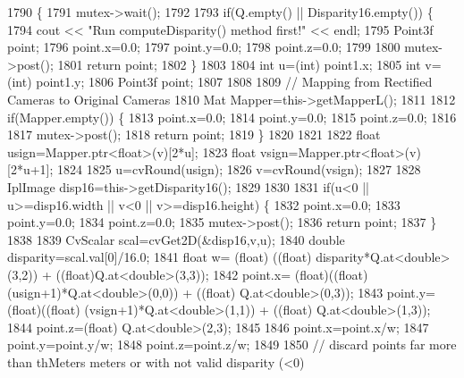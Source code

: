 \begin{DoxyCode}
1790                                                                           \{
1791     mutex->wait();
1792 
1793     \textcolor{keywordflow}{if}(Q.empty() || Disparity16.empty()) \{
1794         cout << \textcolor{stringliteral}{"Run computeDisparity() method first!"} << endl;
1795         Point3f point;
1796         point.x=0.0;
1797         point.y=0.0;
1798         point.z=0.0;
1799 
1800         mutex->post();
1801         \textcolor{keywordflow}{return} point;
1802     \}
1803 
1804     \textcolor{keywordtype}{int} u=(int) point1.x; 
1805     \textcolor{keywordtype}{int} v=(\textcolor{keywordtype}{int}) point1.y;
1806     Point3f point;
1807 
1808 
1809     \textcolor{comment}{// Mapping from Rectified Cameras to Original Cameras}
1810     Mat Mapper=this->getMapperL();
1811 
1812     \textcolor{keywordflow}{if}(Mapper.empty()) \{
1813         point.x=0.0;
1814         point.y=0.0;
1815         point.z=0.0;
1816        
1817         mutex->post();
1818         \textcolor{keywordflow}{return} point;
1819     \}
1820 
1821 
1822     \textcolor{keywordtype}{float} usign=Mapper.ptr<\textcolor{keywordtype}{float}>(v)[2*u];
1823     \textcolor{keywordtype}{float} vsign=Mapper.ptr<\textcolor{keywordtype}{float}>(v)[2*u+1]; 
1824 
1825     u=cvRound(usign);
1826     v=cvRound(vsign);
1827 
1828     IplImage disp16=this->getDisparity16();
1829     
1830 
1831     \textcolor{keywordflow}{if}(u<0 || u>=disp16.width || v<0 || v>=disp16.height) \{
1832         point.x=0.0;
1833         point.y=0.0;
1834         point.z=0.0;
1835         mutex->post();
1836         \textcolor{keywordflow}{return} point;
1837     \}
1838 
1839     CvScalar scal=cvGet2D(&disp16,v,u);
1840     \textcolor{keywordtype}{double} disparity=scal.val[0]/16.0;
1841     \textcolor{keywordtype}{float} w= (float) ((\textcolor{keywordtype}{float}) disparity*Q.at<\textcolor{keywordtype}{double}>(3,2)) + ((float)Q.at<\textcolor{keywordtype}{double}>(3,3));
1842     point.x= (float)((\textcolor{keywordtype}{float}) (usign+1)*Q.at<\textcolor{keywordtype}{double}>(0,0)) + ((\textcolor{keywordtype}{float}) Q.at<\textcolor{keywordtype}{double}>(0,3));
1843     point.y=(float)((\textcolor{keywordtype}{float}) (vsign+1)*Q.at<\textcolor{keywordtype}{double}>(1,1)) + ((\textcolor{keywordtype}{float}) Q.at<\textcolor{keywordtype}{double}>(1,3));
1844     point.z=(float) Q.at<\textcolor{keywordtype}{double}>(2,3);
1845 
1846     point.x=point.x/w;
1847     point.y=point.y/w;
1848     point.z=point.z/w;
1849 
1850     \textcolor{comment}{// discard points far more than thMeters meters or with not valid disparity (<0)}

\end{DoxyCode}
